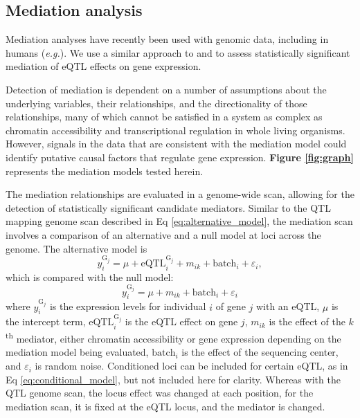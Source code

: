 \documentclass[9pt,twocolumn,twoside]{gsajnl}
\newcommand{\eg}{\emph{e.g.}\xspace}
\begin{document}
\subsection{Mediation analysis}

Mediation analyses have recently been used with genomic data, including in humans (\eg \citealt{Battle2014}). We use a similar approach to \cite{Chick2016} and \cite{Keller2018} to assess statistically significant mediation of eQTL effects on gene expression.

Detection of mediation is dependent on a number of assumptions about the underlying variables, their relationships, and the directionality of those relationships, many of which cannot be satisfied in a system as complex as chromatin accessibility and transcriptional regulation in whole living organisms. However, signals in the data that are consistent with the mediation model could identify putative causal factors that regulate gene expression. \textbf{Figure \ref{fig:graph}} represents the mediation models tested herein.

The mediation relationships are evaluated in a genome-wide scan, allowing for the detection of statistically significant candidate mediators. Similar to the QTL mapping genome scan described in Eq \ref{eq:alternative_model}, the mediation scan involves a comparison of an alternative and a null model at loci across the genome. The alternative model is
\begin{equation}
y^{\text{G}_{j}}_{i} = \mu + \text{eQTL}_{i}^{\text{G}_{j}} + m_{ik} + \text{batch}_{i} + \varepsilon_{i},
\label{eq:mediation_alt}
\end{equation}
which is compared with the null model:
\begin{equation}
y^{\text{G}_{j}}_{i} = \mu + m_{ik} \nonumber + \text{batch}_{i} + \varepsilon_{i}
\label{eq:mediation_null}
\end{equation}
where $y^{\text{G}_{j}}_{i}$ is the expression levels for individual $i$ of gene $j$ with an eQTL, $\mu$ is the intercept term, $\text{eQTL}_{i}^{\text{G}_{j}}$ is the eQTL effect on gene $j$, $m_{ik}$ is the effect of the $k$\textsuperscript{th} mediator, either chromatin accessibility or gene expression depending on the mediation model being evaluated, $\text{batch}_{i}$ is the effect of the sequencing center, and $\varepsilon_{i}$ is random noise. Conditioned loci can be included for certain eQTL, as in Eq \ref{eq:conditional_model}, but not included here for clarity. Whereas with the QTL genome scan, the locus effect was changed at each position, for the mediation scan, it is fixed at the eQTL locus, and the mediator is changed.
\end{document}
